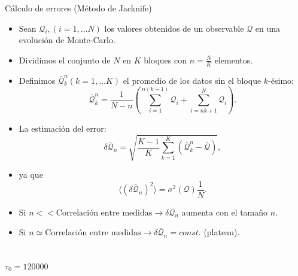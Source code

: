 \documentclass[xcolor=dvipsnames]{beamer}
\begin{document}
\begin{frame}{Cálculo de errores (Método de Jacknife)}
  \begin{itemize}
  \item Sean $\mathcal{Q}_i,(i=1,\dots N)$ los valores obtenidos de un
    observable $\mathcal{Q}$ en una evolución de Monte-Carlo. 
  \item Dividimos el conjunto de $N$ en $K$ bloques con $n=\frac{N}{K}$
    elementos.
  \item Definimos $\bar{\mathcal{Q}}_k^n(k=1,\dots K)$ el promedio de los
    datos sin el bloque $k$-ésimo:
    $$\bar{\mathcal{Q}}_k^n=\frac{1}{N-n}\left(\sum^{n(k-1)}_{i=1}\mathcal{Q}_i+\sum^{N}_{i=nk+1}\mathcal{Q}_i\right).$$
\item La estimación del error:
$$\delta\bar{\mathcal{Q}}_n=\sqrt{\frac{K-1}{K}\sum^K_{k=1}(\bar{\mathcal{Q}}^n_k-\bar{\mathcal{Q}})},$$
\item ya que
  $$ \langle (\delta\bar{\mathcal{Q}}_n)^2\rangle=\sigma^2(\mathcal{Q})\frac{1}{N}.$$
\end{itemize}
\end{frame}

\begin{frame}
\begin{itemize}
\item Si $n<<\text{Correlación entre medidas}\rightarrow
  \delta\bar{\mathcal{Q}}_n$ aumenta con el tamaño $n$.
\item Si $n\simeq \text{Correlación entre
    medidas}\rightarrow\delta\bar{\mathcal{Q}}_n=const.$ (plateau).
\end{itemize}
\begin{columns}
  \begin{column}{6cm}
    \begin{figure}
      \resizebox{\columnwidth}{!}{}
    \end{figure}
  \end{column}
  \begin{column}{6cm}
     \begin{figure}
       \resizebox{\columnwidth}{!}{}
    \end{figure}
  \end{column}
\end{columns}
\begin{center}
$\tau_0=120000$
\end{center}
\end{frame}
\end{document}
